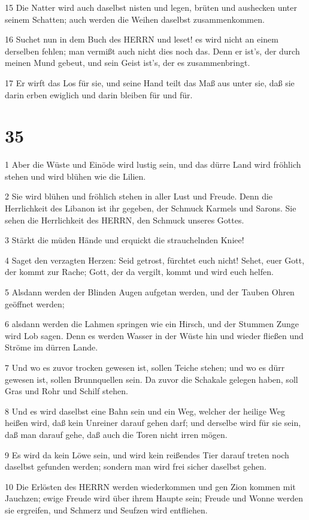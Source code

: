 \par 15 Die Natter wird auch daselbst nisten und legen, brüten und aushecken unter seinem Schatten; auch werden die Weihen daselbst zusammenkommen.
\par 16 Suchet nun in dem Buch des HERRN und leset! es wird nicht an einem derselben fehlen; man vermißt auch nicht dies noch das. Denn er ist's, der durch meinen Mund gebeut, und sein Geist ist's, der es zusammenbringt.
\par 17 Er wirft das Los für sie, und seine Hand teilt das Maß aus unter sie, daß sie darin erben ewiglich und darin bleiben für und für.

\chapter{35}

\par 1 Aber die Wüste und Einöde wird lustig sein, und das dürre Land wird fröhlich stehen und wird blühen wie die Lilien.
\par 2 Sie wird blühen und fröhlich stehen in aller Lust und Freude. Denn die Herrlichkeit des Libanon ist ihr gegeben, der Schmuck Karmels und Sarons. Sie sehen die Herrlichkeit des HERRN, den Schmuck unseres Gottes.
\par 3 Stärkt die müden Hände und erquickt die strauchelnden Kniee!
\par 4 Saget den verzagten Herzen: Seid getrost, fürchtet euch nicht! Sehet, euer Gott, der kommt zur Rache; Gott, der da vergilt, kommt und wird euch helfen.
\par 5 Alsdann werden der Blinden Augen aufgetan werden, und der Tauben Ohren geöffnet werden;
\par 6 alsdann werden die Lahmen springen wie ein Hirsch, und der Stummen Zunge wird Lob sagen. Denn es werden Wasser in der Wüste hin und wieder fließen und Ströme im dürren Lande.
\par 7 Und wo es zuvor trocken gewesen ist, sollen Teiche stehen; und wo es dürr gewesen ist, sollen Brunnquellen sein. Da zuvor die Schakale gelegen haben, soll Gras und Rohr und Schilf stehen.
\par 8 Und es wird daselbst eine Bahn sein und ein Weg, welcher der heilige Weg heißen wird, daß kein Unreiner darauf gehen darf; und derselbe wird für sie sein, daß man darauf gehe, daß auch die Toren nicht irren mögen.
\par 9 Es wird da kein Löwe sein, und wird kein reißendes Tier darauf treten noch daselbst gefunden werden; sondern man wird frei sicher daselbst gehen.
\par 10 Die Erlösten des HERRN werden wiederkommen und gen Zion kommen mit Jauchzen; ewige Freude wird über ihrem Haupte sein; Freude und Wonne werden sie ergreifen, und Schmerz und Seufzen wird entfliehen.

